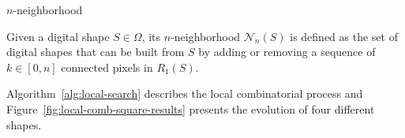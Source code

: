\begin{definition}{$n$-neighborhood}

	Given a digital shape $S \in \Omega$, its $n$-neigh\-bor\-hood $\mathcal{N}_n(S)$ is defined as the set of digital shapes that can be built from $S$ by adding or removing a sequence of $k \in [0,n]$ connected pixels in $R_1(S)$.

\end{definition}




Algorithm~\ref{alg:local-search} describes the local combinatorial process and Figure~\ref{fig:local-comb-square-results} presents the evolution of four different shapes.


\begin{figure}[]
\center
{}\hspace{1em}%
\subfloat{
}
\end{figure}
